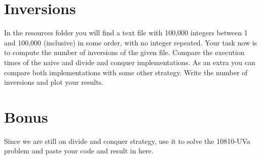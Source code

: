 \documentclass[a4 paper,12pt]{article}
\begin{document}
\section{Inversions}

In the resources folder you will find a text file with 100,000 integers between 1 and 100,000 (inclusive) in some order, with no integer repeated. Your task now is to compute the number of inversions of the given file. Compare the execution times of the naive and divide and conquer implementations. As an extra you can compare both implementations with some other strategy. Write the number of inversions and plot your results.

\section{Bonus}

Since we are still on divide and conquer strategy, use it to solve the 10810-UVa problem and paste your code and result in here.
\end{document}
